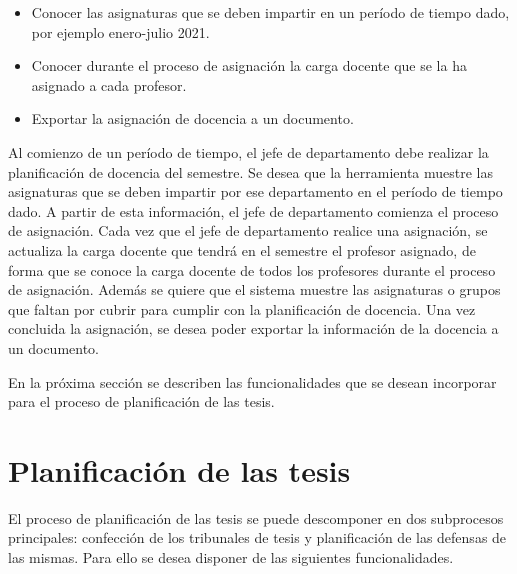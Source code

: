 \begin{itemize}
    \item Conocer las asignaturas que se deben impartir en un período de tiempo dado, por ejemplo enero-julio 2021.
    \item Conocer durante el proceso de asignación la carga docente que se la ha asignado a cada profesor.
    \item Exportar la asignación de docencia a un documento.
\end{itemize}




Al comienzo de un período de tiempo, el jefe de departamento debe realizar la planificación de docencia
del semestre. Se desea que la herramienta muestre las asignaturas que se deben impartir por ese departamento en el período de tiempo dado.
A partir de esta información, el jefe de departamento comienza el proceso de asignación. Cada vez que el jefe de departamento realice una 
asignación, se actualiza la carga docente que tendrá en el semestre el profesor asignado, de forma que se conoce la carga 
docente de todos los profesores durante el proceso de asignación. Además se quiere que el sistema muestre las asignaturas o 
grupos que faltan por cubrir para cumplir con la planificación de docencia. Una vez concluida la asignación, se desea poder
exportar la información de la docencia a un documento.

En la próxima sección se describen las funcionalidades que se desean incorporar para el 
proceso de planificación de las tesis.


\section{Planificación de las tesis}
El proceso de planificación de las tesis se puede descomponer en dos subprocesos principales: 
confección de los tribunales de tesis y planificación de las defensas de las mismas.
Para ello se desea disponer de las siguientes funcionalidades.



